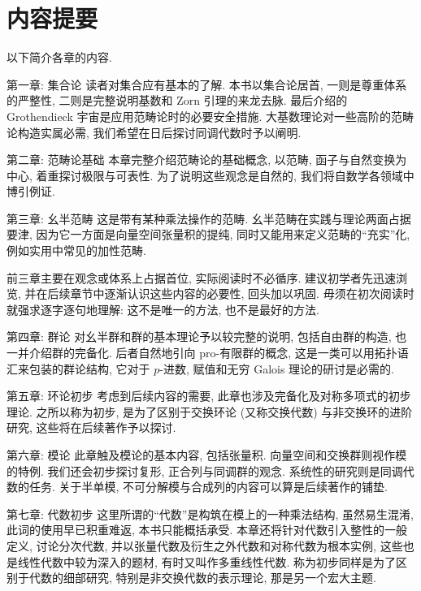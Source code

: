 \section*{内容提要}
以下简介各章的内容.

\begin{asparadesc}
	\item[第一章: 集合论] 读者对集合应有基本的了解. 本书以集合论居首, 一则是尊重体系的严整性, 二则是完整说明基数和 Zorn 引理的来龙去脉. 最后介绍的 Grothendieck 宇宙是应用范畴论时的必要安全措施. 大基数理论对一些高阶的范畴论构造实属必需, 我们希望在日后探讨同调代数时予以阐明.
	
	\item[第二章: 范畴论基础] 本章完整介绍范畴论的基础概念, 以范畴, 函子与自然变换为中心, 着重探讨极限与可表性. 为了说明这些观念是自然的, 我们将自数学各领域中博引例证.
	
	\item[第三章: 幺半范畴] 这是带有某种乘法操作的范畴. 幺半范畴在实践与理论两面占据要津, 因为它一方面是向量空间张量积的提纯, 同时又能用来定义范畴的``充实''化, 例如实用中常见的加性范畴.

	前三章主要在观念或体系上占据首位, 实际阅读时不必循序. 建议初学者先迅速浏览, 并在后续章节中逐渐认识这些内容的必要性, 回头加以巩固. 毋须在初次阅读时就强求逐字逐句地理解: 这不是唯一的方法, 也不是最好的方法.

	\item[第四章: 群论] 对幺半群和群的基本理论予以较完整的说明, 包括自由群的构造, 也一并介绍群的完备化. 后者自然地引向 pro-有限群的概念, 这是一类可以用拓扑语汇来包装的群论结构, 它对于 $p$-进数, 赋值和无穷 Galois 理论的研讨是必需的.
	
	\item[第五章: 环论初步] 考虑到后续内容的需要, 此章也涉及完备化及对称多项式的初步理论. 之所以称为初步, 是为了区别于交换环论 (又称交换代数) 与非交换环的进阶研究, 这些将在后续著作予以探讨.
	
	\item[第六章: 模论] 此章触及模论的基本内容, 包括张量积. 向量空间和交换群则视作模的特例. 我们还会初步探讨复形, 正合列与同调群的观念. 系统性的研究则是同调代数的任务. 关于半单模, 不可分解模与合成列的内容可以算是后续著作的铺垫.
	
	\item[第七章: 代数初步] 这里所谓的``代数''是构筑在模上的一种乘法结构, 虽然易生混淆, 此词的使用早已积重难返, 本书只能概括承受. 本章还将针对代数引入整性的一般定义, 讨论分次代数, 并以张量代数及衍生之外代数和对称代数为根本实例, 这些也是线性代数中较为深入的题材, 有时又叫作多重线性代数. 称为初步同样是为了区别于代数的细部研究, 特别是非交换代数的表示理论, 那是另一个宏大主题.
	

\end{asparadesc}
